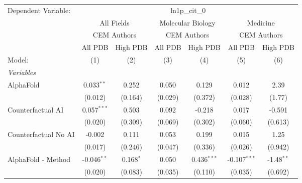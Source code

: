 \begingroup
\centering
\begin{tabular}{lcccccc}
   \tabularnewline \midrule \midrule
   Dependent Variable: & \multicolumn{6}{c}{ln1p\_cit\_0}\\
 & \multicolumn{2}{c}{All Fields} & \multicolumn{2}{c}{Molecular Biology} & \multicolumn{2}{c}{Medicine} \\
\cmidrule(lr){2-3} \cmidrule(lr){4-5} \cmidrule(lr){6-7}
 & \multicolumn{2}{c}{CEM Authors} & \multicolumn{2}{c}{CEM Authors} & \multicolumn{2}{c}{CEM Authors} \\
\cmidrule(lr){2-3} \cmidrule(lr){4-5} \cmidrule(lr){6-7}
 & \multicolumn{1}{c}{All PDB} & \multicolumn{1}{c}{High PDB} & \multicolumn{1}{c}{All PDB} & \multicolumn{1}{c}{High PDB} & \multicolumn{1}{c}{All PDB} & \multicolumn{1}{c}{High PDB} \\
\cmidrule(lr){2-2} \cmidrule(lr){3-3} \cmidrule(lr){4-4} \cmidrule(lr){5-5} \cmidrule(lr){6-6} \cmidrule(lr){7-7}
   Model:                                                     & (1)           & (2)           & (3)     & (4)           & (5)            & (6)\\  
   \midrule
   \emph{Variables}\\
   AlphaFold                                                  & 0.033$^{**}$  & 0.252         & 0.050   & 0.129         & 0.012          & 2.39\\   
                                                              & (0.012)       & (0.164)       & (0.029) & (0.372)       & (0.028)        & (1.77)\\   
   Counterfactual AI                                          & 0.057$^{***}$ & 0.503         & 0.092   & -0.218        & 0.017          & -0.591\\   
                                                              & (0.020)       & (0.309)       & (0.069) & (0.302)       & (0.060)        & (0.613)\\   
   Counterfactual No AI                                       & -0.002        & 0.111         & 0.053   & 0.199         & 0.015          & 1.25\\   
                                                              & (0.017)       & (0.246)       & (0.047) & (0.336)       & (0.026)        & (0.942)\\   
   AlphaFold - Method                                         & -0.046$^{**}$ & 0.168$^{*}$   & 0.050   & 0.436$^{***}$ & -0.107$^{***}$ & -1.48$^{**}$\\   
                                                              & (0.020)       & (0.083)       & (0.035) & (0.110)       & (0.035)        & (0.692)\\   

\end{tabular}
